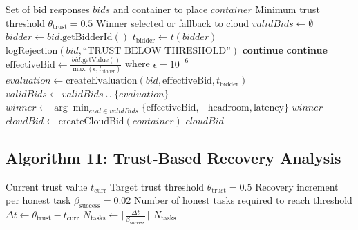 \documentclass[12pt,a4paper]{article}
\begin{document}
\begin{algorithm}[H]
\caption{Select Winning Bid with Trust Consideration}
\begin{algorithmic}[1]
\Require Set of bid responses $bids$ and container to place $container$
\Require Minimum trust threshold $\theta_{\text{trust}} = 0.5$
\Ensure Winner selected or fallback to cloud
\State $validBids \gets \emptyset$
\State
\State {}
    \State $bidder \gets bid.\text{getBidderId}()$
    \State $t_{\text{bidder}} \gets t(bidder)$
    \State
    \State {}
        \State $\text{logRejection}(bid, \text{``TRUST\_BELOW\_THRESHOLD''})$
        \State \textbf{continue}
    \EndIf
    \State
    \State {}
        \State \textbf{continue}
    \EndIf
    \State
    \State {}
    \State $\text{effectiveBid} \gets \frac{bid.\text{getValue}()}{\max(\epsilon, t_{\text{bidder}})}$ where $\epsilon = 10^{-6}$
    \State $evaluation \gets \text{createEvaluation}(bid, \text{effectiveBid}, t_{\text{bidder}})$
    \State $validBids \gets validBids \cup \{evaluation\}$
\EndFor
\State
\State {}
    \State $winner \gets \arg\min_{eval \in validBids} \{\text{effectiveBid}, -\text{headroom}, \text{latency}\}$
    \State \Return $winner$
\Else
    \State {}
    \State $cloudBid \gets \text{createCloudBid}(container)$
    \State \Return $cloudBid$
\EndIf
\end{algorithmic}
\end{algorithm}

\subsection{Algorithm 11: Trust-Based Recovery Analysis}

\begin{algorithm}[H]
\caption{Compute Recovery Time from Low Trust}
\begin{algorithmic}[1]
\Require Current trust value $t_{\text{curr}}$
\Require Target trust threshold $\theta_{\text{trust}} = 0.5$
\Require Recovery increment per honest task $\beta_{\text{success}} = 0.02$
\Ensure Number of honest tasks required to reach threshold
    \State {} 
\EndIf
\State
\State $\Delta t \gets \theta_{\text{trust}} - t_{\text{curr}}$
\State $N_{\text{tasks}} \gets \lceil \frac{\Delta t}{\beta_{\text{success}}} \rceil$
\State
\State \Return $N_{\text{tasks}}$
\end{algorithmic}
\end{algorithm}
\end{document}
